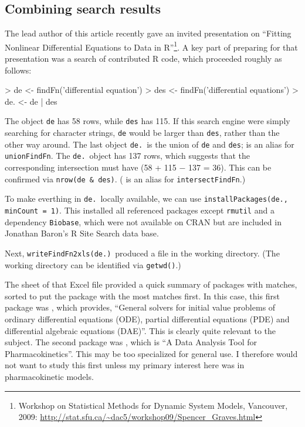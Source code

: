 \documentclass[a4paper]{report}
\begin{document}
\begin{article}
\section{Combining search results}

The lead author of this article recently gave an invited presentation
on ``Fitting Nonlinear Differential Equations to Data in R''\footnote{Workshop
on Statistical Methods for Dynamic System Models, Vancouver, 2009: \url{http://stat.sfu.ca/~dac5/workshop09/Spencer_Graves.html}}.
A key part of preparing for that presentation was a search of
contributed R code, which proceeded roughly as follows:

\begin{Schunk}
\begin{Sinput}
> de <- findFn('differential equation')
> des <- findFn('differential equations')
> de. <- de | des
\end{Sinput}
\end{Schunk}

The object {\tt de} has 58 rows, while {\tt des} has 115.
If this search engine were simply searching for character
strings, {\tt de} would be larger than {\tt des}, rather than
the other way around.  The last object {\tt de.}\ is the union
of {\tt de} and {\tt des};  \samp{|} is an alias for {\tt unionFindFn}.
The {\tt de.}\ object has 137 rows, which suggests that
the corresponding intersection must have (58 + 115 $-$ 137 = 36). This can be confirmed via {\tt nrow(de \& des)}.
(\samp{\&} is an alias for {\tt intersectFindFn}.)

To make everthing in {\tt de.}\ locally available, we can use
{\tt installPackages(de., minCount = 1)}.  This installed all
referenced packages except {\tt rmutil} and a dependency {\tt Biobase},
which were not available on CRAN but are included in Jonathan
Baron's R Site Search data base.

Next, {\tt writeFindFn2xls(de.)}\ produced a file 
in the working directory.  (The working directory can be
identified via {\tt getwd()}.)

The  sheet of that Excel file provided a quick
summary of packages with matches, sorted to put the package
with the most matches first.  In this case, this first package
was , which provides, ``General solvers for initial
value problems of ordinary differential equations (ODE),
partial differential equations (PDE) and differential
algebraic equations (DAE)''.  This is clearly quite relevant
to the subject.  The second package was , which
is ``A Data Analysis Tool for Pharmacokinetics''.  This may
be too specialized for general use.  I therefore would not
want to study this first unless my primary interest here was in
pharmacokinetic models.


\end{article}
\end{document}
